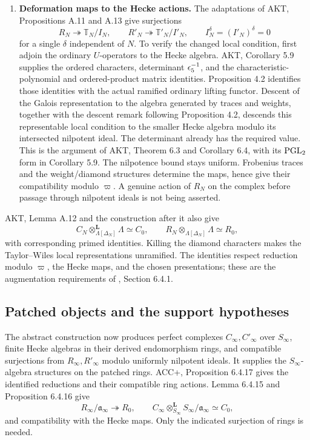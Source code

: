 \documentclass[11pt,a4paper]{article}
\theoremstyle{definition}\newtheorem{definition}[theorem]{Definition}
\theoremstyle{remark}\newtheorem*{remark}{Remark}
\begin{document}
\begin{enumerate}[label=\textbf{\arabic*.},leftmargin=24pt]
\item \textbf{Deformation maps to the Hecke actions.}
The adaptations of AKT, Propositions A.11 and A.13 give surjections
\[
R_N\twoheadrightarrow\mathbb T_N/I_N,\qquad
R'_N\twoheadrightarrow\mathbb T'_N/I'_N,
\qquad I_N^\delta=(I'_N)^\delta=0
\]
for a single $\delta$ independent of $N$. To verify the changed local
condition, first adjoin the ordinary $U$-operators to the Hecke algebra.
AKT, Corollary 5.9 supplies the ordered characters, determinant
$\epsilon_5^{-1}$, and the characteristic-polynomial and ordered-product matrix
identities. Proposition 4.2 identifies those identities with the actual
ramified ordinary lifting functor. Descent of the Galois representation to
the algebra generated by traces and weights, together with the descent
remark following Proposition 4.2, descends this representable local condition
to the smaller Hecke algebra modulo its intersected nilpotent ideal.
The determinant already has the required value. This is the argument of
AKT, Theorem 6.3 and Corollary 6.4, with its $\operatorname{PGL}_2$ form in Corollary 5.9.
The nilpotence bound stays uniform. Frobenius traces and the
weight/diamond structures determine the maps, hence give their compatibility
modulo $\varpi$. A genuine action of $R_N$ on the complex before passage
through nilpotent ideals is not being asserted.
\end{enumerate}

AKT, Lemma A.12 and the construction after it also give
\[
C_N\otimes^{\mathbf L}_{\Lambda[\Delta_N]}\Lambda\simeq C_0,
\qquad
R_N\otimes_{\Lambda[\Delta_N]}\Lambda\simeq R_0,
\]
with corresponding primed identities. Killing the diamond characters makes
the Taylor--Wiles local representations unramified. The identities respect
reduction modulo $\varpi$, the Hecke maps, and the chosen presentations;
these are the augmentation requirements of \cite{ACC}, Section 6.4.1.

\subsection{Patched objects and the support hypotheses}

The abstract construction now produces perfect complexes $C_\infty,C'_\infty$
over $S_\infty$, finite Hecke algebras in their derived endomorphism rings,
and compatible surjections from $R_\infty,R'_\infty$ modulo uniformly
nilpotent ideals. It supplies the $S_\infty$-algebra structures on the patched
rings. ACC+, Proposition 6.4.17 gives the identified reductions and their
compatible ring actions. Lemma 6.4.15 and Proposition 6.4.16 give
\begin{equation}\label{eq:augmentation}
R_\infty/\mathfrak a_\infty\twoheadrightarrow R_0,
\qquad
C_\infty\otimes^{\mathbf L}_{S_\infty}S_\infty/\mathfrak a_\infty
\simeq C_0,
\end{equation}
and compatibility with the Hecke maps. Only the indicated surjection of
rings is needed.
\end{document}
